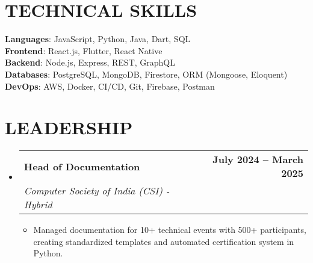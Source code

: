 \documentclass[letterpaper,11pt]{article}
\makeatletter
\newcommand{\resumeItem}[1]{
  \item\small{
    {#1 \vspace{-2pt}}
  }
}
\newcommand{\resumeSubheading}[4]{
  \vspace{-2pt}\item
    \begin{tabular*}{1.0\textwidth}[t]{l@{\extracolsep{\fill}}r}
      \textbf{#1} & \textbf{\small #2} \\
      \textit{\small#3} & \textit{\small #4} \\
    \end{tabular*}\vspace{-7pt}
}
\newcommand{\resumeSubHeadingListStart}{\begin{itemize}[leftmargin=0.0in, label={}]}
\newcommand{\resumeSubHeadingListEnd}{\end{itemize}}
\newcommand{\resumeItemListStart}{\begin{itemize}}
\newcommand{\resumeItemListEnd}{\end{itemize}\vspace{-5pt}}
\makeatother
\begin{document}
\section{TECHNICAL SKILLS}
 \begin{itemize}[leftmargin=0.15in, label={}]
    \small{\item{
     \textbf{Languages}{: JavaScript, Python, Java, Dart, SQL} \\
     \textbf{Frontend}{: React.js, Flutter, React Native} \\
     \textbf{Backend}{: Node.js, Express, REST, GraphQL} \\
     \textbf{Databases}{: PostgreSQL, MongoDB, Firestore, ORM (Mongoose, Eloquent)} \\
     \textbf{DevOps}{: AWS, Docker, CI/CD, Git, Firebase, Postman} \\
    }}
 \end{itemize}
 \vspace{-16pt}

\section{LEADERSHIP}
    \resumeSubHeadingListStart
        \resumeSubheading
          {Head of Documentation}{July 2024 -- March 2025}
          {Computer Society of India (CSI) - Hybrid}{}
          \resumeItemListStart
            \resumeItem{Managed documentation for 10+ technical events with 500+ participants, creating standardized templates and automated certification system in Python.}
          \resumeItemListEnd
    \resumeSubHeadingListEnd
\end{document}
